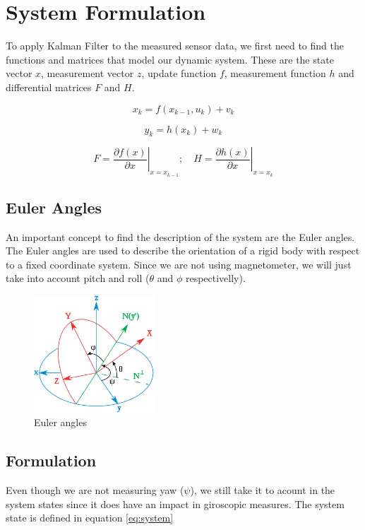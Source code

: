 \section{System Formulation}
To apply Kalman Filter to the measured sensor data, we first need to find the functions and matrices that model our dynamic system. These are the state vector $x$, measurement vector $z$, update function $f$, measurement function $h$ and differential matrices $F$ and $H$.

\begin{equation}
    \label{eq:non_linear_update}
    x_{k} = f( x_{k-1}, u_k) + v_k
\end{equation}

\begin{equation}
    \label{eq:non_linear_meas}
    y_k = h (x_k) + w_k
\end{equation}

\begin{equation}
    F = \left. \frac{\partial f(x)}{\partial x} \right\vert_{x = x_{k-1}}; \quad
    H = \left. \frac{\partial h(x)}{\partial x} \right\vert_{x = x_{k}}
\end{equation}

\subsection{Euler Angles}
An important concept to find the description of the system are the Euler angles. The Euler angles are used to describe the orientation of a rigid body with respect to a fixed coordinate system.
Since we are not using magnetometer, we will just take into account pitch and roll ($\theta$ and $\phi$ respectivelly).

\begin{figure}[h]
\centering
\includegraphics[width=0.4\textwidth]{figures/brian.png}
\caption{Euler angles}
\label{fig:euler}
\end{figure}

\subsection{Formulation}
Even though we are not measuring yaw ($\psi$), we still take it to acount in the system states since it does have an impact in giroscopic measures. The system state is defined in equation \ref{eq:system}

